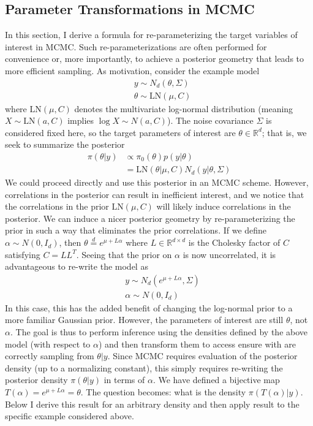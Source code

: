 \documentclass[12pt]{article}
\newcommand{\R}{\mathcal{R}}
\def\R{\mathbb{R}}
\begin{document}
\subsection{Parameter Transformations in MCMC}
In this section, I derive a formula for re-parameterizing the target variables of interest in MCMC. Such re-parameterizations are often performed for convenience
or, more importantly, to achieve a posterior geometry that leads to more efficient sampling. As motivation, consider the example model
\begin{align*}
&y \sim N_d(\theta, \Sigma) \\
&\theta \sim \text{LN}(\mu, C)
\end{align*} 
where $\text{LN}(\mu, C)$ denotes the multivariate log-normal distribution (meaning $X \sim \text{LN}(a, C)$ implies $\log X \sim N(a, C)$). The noise 
covariance $\Sigma$ is considered fixed here, so the target parameters of interest are $\theta \in \R^d$; that is, we seek to summarize the posterior 
\begin{align*}
\pi(\theta|y) &\propto \pi_0(\theta) p(y|\theta) \\
		  &= \text{LN}(\theta| \mu, C) N_d(y|\theta, \Sigma)
\end{align*}
We could proceed directly and use this posterior in an MCMC scheme. However, correlations in the posterior can result in inefficient interest, and we notice that 
the correlations in the prior $\text{LN}(\mu, C)$ will likely induce correlations in the posterior. We can induce a nicer posterior geometry by re-parameterizing the prior
in such a way that eliminates the prior correlations. If we define $\alpha \sim N(0, I_d)$, then $\theta \overset{d}{=} e^{\mu + L\alpha}$ where $L \in \R^{d \times d}$ is 
the Cholesky factor of $C$ satisfying $C = L L^T$. Seeing that the prior on $\alpha$ is now uncorrelated, it is advantageous to re-write the model as
\begin{align*}
&y \sim N_d(e^{\mu + L\alpha}, \Sigma) \\
&\alpha \sim N(0, I_d)
\end{align*}
In this case, this has the added benefit of changing the log-normal prior to a more familiar Gaussian prior.  
However, the parameters of interest are still $\theta$, not $\alpha$. The goal is thus to perform inference using the densities defined by the above 
model (with respect to $\alpha$) and then transform them to access ensure with are correctly sampling from $\theta|y$. Since MCMC
requires evaluation of the posterior density (up to a normalizing constant), this simply requires re-writing the posterior density 
$\pi(\theta|y)$ in terms of $\alpha$. We have defined a bijective map $T(\alpha) = e^{\mu + L\alpha} = \theta$. The question becomes: what is the 
density $\pi(T(\alpha)|y)$. Below I derive this result for an arbitrary density and then apply result to the specific example considered above. 
\end{document}
